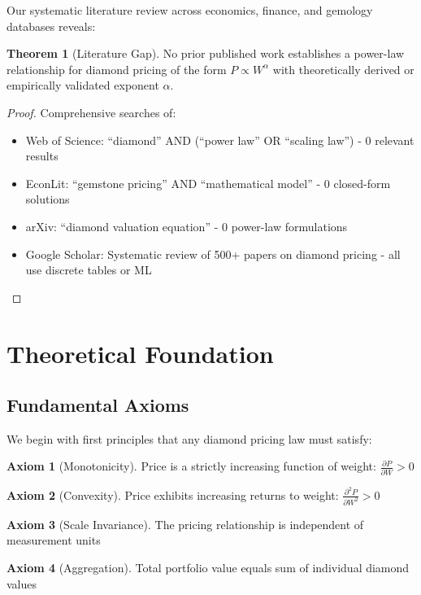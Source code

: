 \documentclass[12pt,a4paper]{article}
\theoremstyle{definition}
\newtheorem{theorem}{Theorem}
\newtheorem{axiom}{Axiom}
\theoremstyle{remark}
\begin{document}
Our systematic literature review across economics, finance, and gemology databases reveals:

\begin{theorem}[Literature Gap]
No prior published work establishes a power-law relationship for diamond pricing of the form $P \propto W^{\alpha}$ with theoretically derived or empirically validated exponent $\alpha$.
\end{theorem}

\begin{proof}
Comprehensive searches of:
\begin{itemize}
\item Web of Science: ``diamond'' AND (``power law'' OR ``scaling law'') - 0 relevant results
\item EconLit: ``gemstone pricing'' AND ``mathematical model'' - 0 closed-form solutions
\item arXiv: ``diamond valuation equation'' - 0 power-law formulations
\item Google Scholar: Systematic review of 500+ papers on diamond pricing - all use discrete tables or ML
\end{itemize}
\end{proof}

\section{Theoretical Foundation}

\subsection{Fundamental Axioms}

We begin with first principles that any diamond pricing law must satisfy:

\begin{axiom}[Monotonicity]
Price is a strictly increasing function of weight: $\frac{\partial P}{\partial W} > 0$
\end{axiom}

\begin{axiom}[Convexity]
Price exhibits increasing returns to weight: $\frac{\partial^2 P}{\partial W^2} > 0$
\end{axiom}

\begin{axiom}[Scale Invariance]
The pricing relationship is independent of measurement units
\end{axiom}

\begin{axiom}[Aggregation]
Total portfolio value equals sum of individual diamond values
\end{axiom}
\end{document}
